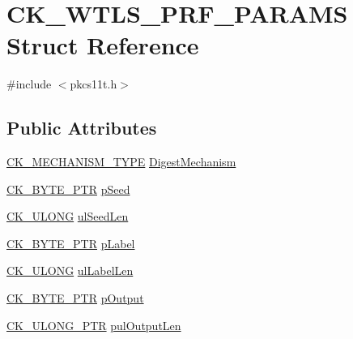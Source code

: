 \hypertarget{struct_c_k___w_t_l_s___p_r_f___p_a_r_a_m_s}{}\section{C\+K\+\_\+\+W\+T\+L\+S\+\_\+\+P\+R\+F\+\_\+\+P\+A\+R\+A\+MS Struct Reference}
\label{struct_c_k___w_t_l_s___p_r_f___p_a_r_a_m_s}


{\ttfamily \#include $<$pkcs11t.\+h$>$}

\subsection*{Public Attributes}
\begin{DoxyCompactItemize}
\item 
\hyperlink{pkcs11t_8h_aaf1084907f5cc09a3e0b85ab022a240d}{C\+K\+\_\+\+M\+E\+C\+H\+A\+N\+I\+S\+M\+\_\+\+T\+Y\+PE} \hyperlink{struct_c_k___w_t_l_s___p_r_f___p_a_r_a_m_s_ac6436a02ffb4456ded679269d39d1ff5}{Digest\+Mechanism}
\item 
\hyperlink{pkcs11t_8h_a3d7233a4077fbaf7ae76b64da0a62a21}{C\+K\+\_\+\+B\+Y\+T\+E\+\_\+\+P\+TR} \hyperlink{struct_c_k___w_t_l_s___p_r_f___p_a_r_a_m_s_a0c3ad364b33803b03e19e5dfdedf3ee5}{p\+Seed}
\item 
\hyperlink{pkcs11t_8h_a35181858a3b7a0a81f49d180d8f446ef}{C\+K\+\_\+\+U\+L\+O\+NG} \hyperlink{struct_c_k___w_t_l_s___p_r_f___p_a_r_a_m_s_a7d8b97f28c8b840279020456f79dd417}{ul\+Seed\+Len}
\item 
\hyperlink{pkcs11t_8h_a3d7233a4077fbaf7ae76b64da0a62a21}{C\+K\+\_\+\+B\+Y\+T\+E\+\_\+\+P\+TR} \hyperlink{struct_c_k___w_t_l_s___p_r_f___p_a_r_a_m_s_a19db3dcedca6d94414ae8129dcc4d9aa}{p\+Label}
\item 
\hyperlink{pkcs11t_8h_a35181858a3b7a0a81f49d180d8f446ef}{C\+K\+\_\+\+U\+L\+O\+NG} \hyperlink{struct_c_k___w_t_l_s___p_r_f___p_a_r_a_m_s_a28b6aa5bf2481a161c0da65b03172c65}{ul\+Label\+Len}
\item 
\hyperlink{pkcs11t_8h_a3d7233a4077fbaf7ae76b64da0a62a21}{C\+K\+\_\+\+B\+Y\+T\+E\+\_\+\+P\+TR} \hyperlink{struct_c_k___w_t_l_s___p_r_f___p_a_r_a_m_s_aca999ea8711746cc82ef707e471e692c}{p\+Output}
\item 
\hyperlink{pkcs11t_8h_af18ced3aa6adcd9f76ae8c132ed2eeb9}{C\+K\+\_\+\+U\+L\+O\+N\+G\+\_\+\+P\+TR} \hyperlink{struct_c_k___w_t_l_s___p_r_f___p_a_r_a_m_s_a677fffe2c77dacb51f64e277258a335d}{pul\+Output\+Len}
\end{DoxyCompactItemize}


